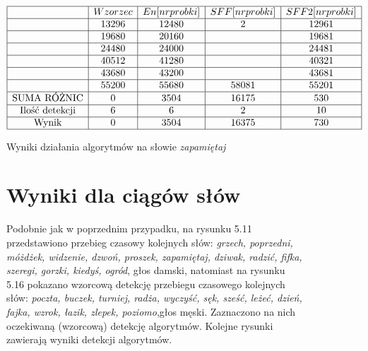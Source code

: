\documentclass[eng,printmode]{mgr}
\begin{document}
	 \begin{figure}
	 	\begin{center}
	 		$\begin{array}{ | c | c | c | c | c | }
	 		\hline
	 		& Wzorzec & En[nr probki] & SFF[nr probki] & SFF2[nr probki] \\ \hline
	 		 & 13296 & 12480 & 2 & 12961 \\ \hline
	 		 & 19680 & 20160 & & 19681   \\ \hline
	 		 & 24480 & 24000 & & 24481    \\ \hline
	 		 & 40512 & 41280 & & 40321  \\ \hline
	 		 & 43680 & 43200 & & 43681   \\ \hline
	 		 & 55200 & 55680 & 58081 & 55201 \\ \hline
	 		\textrm{SUMA RÓŻNIC} & 0 & 3504 & 16175 & 530 \\ \hline
	 		\textrm{Ilość detekcji} & 6 & 6 & 2 & 10 \\ \hline
	 		\textrm{Wynik} & 0 & 3504 & 16375 & 730 \\ \hline
	 		\end{array}
	 		$
	 		\caption{Wyniki działania algorytmów na słowie \emph{zapamiętaj}}
	 	\end{center}
	 	
	 \end{figure}
	 
	 
\begin{figure}

\section{Wyniki dla ciągów słów}
	Podobnie jak w poprzednim przypadku, na rysunku 5.11 przedstawiono przebieg czasowy kolejnych słów: \emph{grzech, poprzedni, móżdżek, widzenie, dzwoń, proszek, zapamiętaj, dziwak, radzić, fifka, szeregi, gorzki, kiedyś, ogród}, głos damski, natomiast na rysunku 5.16 pokazano wzorcową detekcję przebiegu czasowego kolejnych słów: \emph{poczta, buczek, turniej, radża, wyczyść, sęk, sześć, leżeć, dzień, fajka, wzrok, łazik, zlepek, poziomo},głos męski. Zaznaczono na nich oczekiwaną (wzorcową) detekcję algorytmów.
	Kolejne rysunki zawierają wyniki detekcji algorytmów.\\
	
	
\end{figure}
\end{document}
